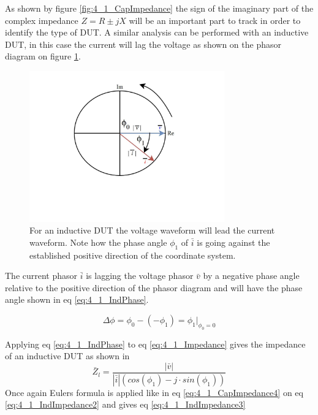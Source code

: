 As shown by figure \ref{fig:4_1_CapImpedance} the sign of the imaginary part of the complex impedance $Z = R \pm jX$ will be an important part to track in order to identify the type of DUT. A similar analysis can be performed with an inductive DUT, in this case the current will lag the voltage as shown on the phasor diagram on figure \ref{fig:4_1_IndPhasor}.
\begin{figure}[H]
    \centering
    \includegraphics[clip, trim=0 175 0 0, width=0.75\textwidth]{Sections/4_TechnicalAnalysis/Figures/4_1_InductivePhasor.pdf}
    \caption{For an inductive DUT the voltage waveform will lead the current waveform. Note how the phase angle $\phi_1$ of $\bar i$ is going against the established positive direction of the coordinate system.}
    \label{fig:4_1_IndPhasor}
\end{figure}

The current phasor $\bar i$ is lagging the voltage phasor $\bar v$ by a negative phase angle relative to the positive direction of the phasor diagram and will have the phase angle shown in eq \ref{eq:4_1_IndPhase}.

\begin{equation}\label{eq:4_1_IndPhase}
    \Delta \phi = \phi_0 -(-\phi_1) =\phi_1 \bigg\rvert_{\phi_0 = 0}
\end{equation}

Applying eq \ref{eq:4_1_IndPhase} to eq \ref{eq:4_1_Impedance} gives the impedance of an inductive DUT as shown in 
\begin{equation}\label{eq:4_1_IndImpedance2}
    \bar Z_l = \frac{|\bar v|}{|\bar i| (cos(\phi_1) -j\cdot sin(\phi_1))}
\end{equation}
Once again Eulers formula is applied like in eq \ref{eq:4_1_CapImpedance4} on eq \ref{eq:4_1_IndImpedance2} and gives eq \ref{eq:4_1_IndImpedance3}

